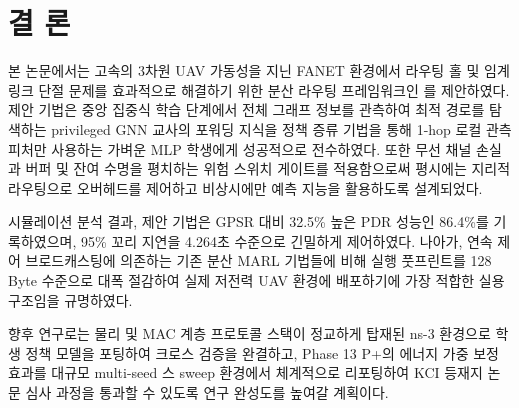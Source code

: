 \section{결 론}
\label{sec:결론}

본 논문에서는 고속의 3차원 UAV 가동성을 지닌 FANET 환경에서 라우팅 홀 및 임계 링크 단절 문제를 효과적으로 해결하기 위한 분산 라우팅 프레임워크인 \method{}를 제안하였다. 제안 기법은 중앙 집중식 학습 단계에서 전체 그래프 정보를 관측하여 최적 경로를 탐색하는 privileged GNN 교사의 포워딩 지식을 정책 증류 기법을 통해 1-hop 로컬 관측 피처만 사용하는 가벼운 MLP 학생에게 성공적으로 전수하였다. 또한 무선 채널 손실과 버퍼 및 잔여 수명을 평치하는 위험 스위치 게이트를 적용함으로써 평시에는 지리적 라우팅으로 오버헤드를 제어하고 비상시에만 예측 지능을 활용하도록 설계되었다.

시뮬레이션 분석 결과, 제안 기법은 GPSR 대비 32.5\% 높은 PDR 성능인 86.4\%를 기록하였으며, 95\% 꼬리 지연을 4.264초 수준으로 긴밀하게 제어하였다. 나아가, 연속 제어 브로드캐스팅에 의존하는 기존 분산 MARL 기법들에 비해 실행 풋프린트를 128 Byte 수준으로 대폭 절감하여 실제 저전력 UAV 환경에 배포하기에 가장 적합한 실용 구조임을 규명하였다.

향후 연구로는 물리 및 MAC 계층 프로토콜 스택이 정교하게 탑재된 ns-3 환경으로 학생 정책 모델을 포팅하여 크로스 검증을 완결하고, Phase 13 P+의 에너지 가중 보정 효과를 대규모 multi-seed 스 sweep 환경에서 체계적으로 리포팅하여 KCI 등재지 논문 심사 과정을 통과할 수 있도록 연구 완성도를 높여갈 계획이다.
